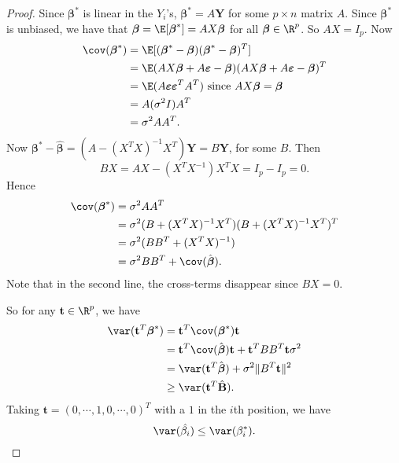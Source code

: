 \documentclass[a4paper]{article}
\begin{document}
\begin{proof}
  Since $\boldsymbol\beta^*$ is linear in the $Y_i$'s, $\boldsymbol\beta^* = A\mathbf{Y}$ for some $p\times n$ matrix $A$. Since $\boldsymbol\beta^*$ is unbiased,  we have that $\boldsymbol\beta = \E[\boldsymbol\beta^*] = AX\boldsymbol\beta$ for all $\boldsymbol\beta\in \R^p$. So $AX = I_p$. Now
  \begin{align*}
    \cov(\boldsymbol\beta^*) &= \E[(\boldsymbol\beta^* - \boldsymbol\beta)(\boldsymbol\beta^* - \boldsymbol\beta)^T]\\
    &= \E(AX\boldsymbol\beta + A\boldsymbol\varepsilon - \boldsymbol\beta)(AX\boldsymbol\beta + A\boldsymbol\varepsilon - \boldsymbol\beta)^T\\
    &= \E(A\boldsymbol\varepsilon\boldsymbol\varepsilon^TA^T)\text{ since }AX\boldsymbol\beta = \boldsymbol\beta\\
    &= A(\sigma^2I)A^T\\
    &= \sigma^2 AA^T.
  \end{align*}
  Now $\boldsymbol\beta^* - \hat{\boldsymbol\beta} = (A - (X^TX)^{-1}X^T)\mathbf{Y} = B\mathbf{Y}$, for some $B$. Then
  \[
    BX = AX - (X^TX^{-1})X^TX = I_p - I_p = 0.
  \]
  Hence
  \begin{align*}
    \cov(\boldsymbol\beta^*) &= \sigma^2AA^T\\
    &= \sigma^2(B + (X^TX)^{-1}X^T)(B + (X^TX)^{-1}X^T)^T\\
    &= \sigma^2(BB^T + (X^TX)^{-1})\\
    &= \sigma^2 BB^T + \cov(\hat{\boldsymbol\beta}).
  \end{align*}
  Note that in the second line, the cross-terms disappear since $BX = 0$.

  So for any $\mathbf{t}\in \R^p$, we have
  \begin{align*}
    \var(\mathbf{t}^T\boldsymbol\beta^*) &= \mathbf{t}^T\cov(\boldsymbol\beta^*)\mathbf{t} \\
    &= \mathbf{t}^T\cov (\hat{\boldsymbol\beta})\mathbf{t} + \mathbf{t}^TBB^T\mathbf{t}\sigma^2\\
    &= \var(\mathbf{t}^T \hat{\boldsymbol\beta}) + \sigma^2\|B^T\mathbf{t}\|^2\\
    &\geq \var (\mathbf{t}^T\hat{\mathbf{B}}).
  \end{align*}
  Taking $\mathbf{t} = (0, \cdots, 1, 0, \cdots, 0)^T$ with a $1$ in the $i$th position, we have
  \[
    \var(\hat{\beta_i}) \leq \var(\beta_i^*).
  \]
\end{proof}
\end{document}
